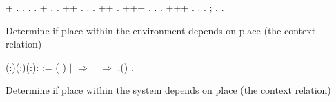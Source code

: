 \documentclass[12pt]{report}
\begin{document}
\begin{coqdoccode}
\coqdocindent{2.00em}
+ .  . .  .\coqdoceol
\coqdocindent{2.00em}
+      .  .\coqdoceol
\coqdocindent{2.00em}
++ . .  .\coqdoceol
\coqdocindent{2.00em}
++  .\coqdoceol
\coqdocindent{2.00em}
+++ . .  .\coqdoceol
\coqdocindent{2.00em}
+++ .  . .  ; .\coqdoceol
\coqdocnoindent
{}.\coqdoceol
\coqdocemptyline
\end{coqdoccode}
Determine if place  within the environment   
    depends on place  (the context relation) 
\begin{coqdoccode}
\coqdocnoindent
{}  (:)(:)(:): :=\coqdoceol
\coqdocnoindent
{} ( ) \coqdoceol
\coqdocnoindent
\ensuremath{|}  \ensuremath{\Rightarrow} \coqdoceol
\coqdocnoindent
\ensuremath{|}   \ensuremath{\Rightarrow}   .()\coqdoceol
\coqdocnoindent
{}.\coqdoceol
\coqdocemptyline
\end{coqdoccode}
Determine if place  within the system  depends on place  (the context relation)
\end{document}
